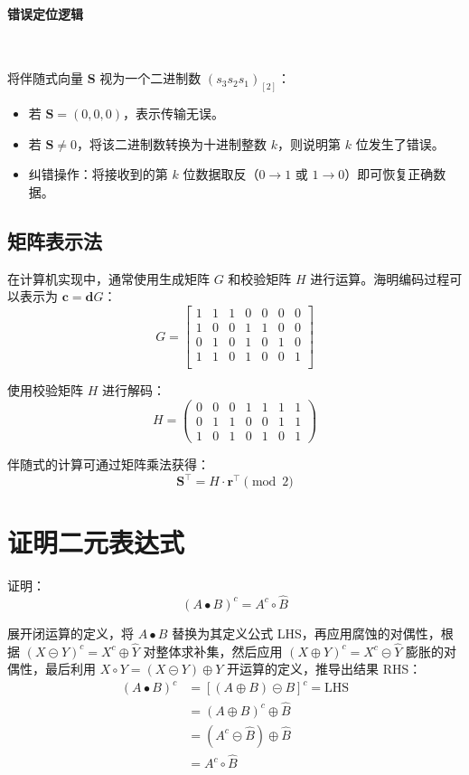 \documentclass{article}
\begin{document}
\paragraph*{错误定位逻辑}~{}

将伴随式向量 $\mathbf{S}$ 视为一个二进制数 $(s_3 s_2 s_1)_{[2]}$：

\begin{itemize}
    \item 若 $\mathbf{S} = (0,0,0)$，表示传输无误。
    \item 若 $\mathbf{S} \neq 0$，将该二进制数转换为十进制整数 $k$，则说明第 $k$ 位发生了错误。
    \item 纠错操作：将接收到的第 $k$ 位数据取反（$0 \to 1$ 或 $1 \to 0$）即可恢复正确数据。
\end{itemize}



\subsection{矩阵表示法}
在计算机实现中，通常使用生成矩阵 $G$ 和校验矩阵 $H$ 进行运算。海明编码过程可以表示为 $\mathbf{c}=\mathbf{d}G$：
\[ G=\left[\begin{matrix}
    1 & 1 & 1 & 0 & 0 & 0 & 0 \\
    1 & 0 & 0 & 1 & 1 & 0 & 0 \\
    0 & 1 & 0 & 1 & 0 & 1 & 0 \\
    1 & 1 & 0 & 1 & 0 & 0 & 1 \\
\end{matrix}\right] \]

使用校验矩阵 $H$ 进行解码：
\[ H=\begin{pmatrix}
    0 & 0 & 0 & 1 & 1 & 1 & 1 \\
    0 & 1 & 1 & 0 & 0 & 1 & 1 \\
    1 & 0 & 1 & 0 & 1 & 0 & 1
\end{pmatrix} \]

伴随式的计算可通过矩阵乘法获得：
\[ \mathbf{S}^{\top} = H \cdot \mathbf{r}^{\top} \pmod 2 \]


\section{证明二元表达式}
证明：
\[ (A\bullet B)^{c}=A^{c}\circ\widehat{B} \]

展开闭运算的定义，将 $A\bullet B$ 替换为其定义公式 LHS，再应用腐蚀的对偶性，根据 $(X\circleddash Y)^{c}=X^{c}\oplus\widehat{Y}$ 对整体求补集，然后应用 $(X\oplus Y)^{c}=X^{c}\circleddash \widehat{Y}$ 膨胀的对偶性，最后利用 $X\circ Y=(X\circleddash Y)\oplus Y$ 开运算的定义，推导出结果 RHS：
\begin{align*}
    (A\bullet B)^{c}&=\left[(A\oplus B)\circleddash B\right]^{c}=\text{LHS}
    \\
    &=(A\oplus B)^{c}\oplus\widehat{B}
    \\
    &=(A^{c}\circleddash\widehat{B})\oplus\widehat{B}
    \\
    &=A^{c}\circ\widehat{B}
\end{align*}
\end{document}
